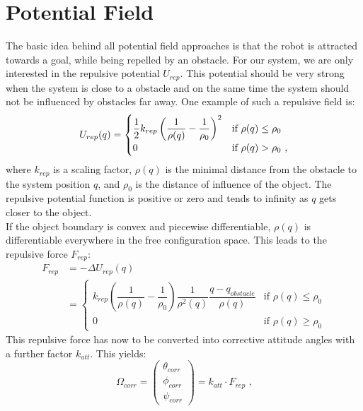 \section{Potential Field}
\label{sec:potential field}
The basic idea behind all potential field approaches is that the robot is attracted towards a goal, while being repelled by an obstacle. For our system, we are only interested in the repulsive potential $U_{rep}$. This potential should be very strong when the system is close to a obstacle and on the same time the system should not be influenced by obstacles far away. One example of such a repulsive field is:
\begin{equation}
\label{eq:pot field}
\centering
U_{rep}(q)=\begin{cases}
\dfrac{1}{2}k_{rep}\left(\dfrac{1}{\rho (q)}-\dfrac{1}{\rho_0}\right)^2 & \text{if } \rho(q)\leq\rho_0 \\
0 & \text{if } \rho(q)>\rho_0 \text{ ,}
\end{cases}
\end{equation}
where $k_{rep}$ is a scaling factor, $\rho(q)$ is the minimal distance from the obstacle to the system position $q$, and $\rho_0$ is the distance of influence of the object. The repulsive potential function is positive or zero and tends to infinity as $q$ gets closer to the object.\\
If the object boundary is convex and piecewise differentiable, $\rho(q)$ is differentiable everywhere in the free configuration space. This leads to the repulsive force $F_{rep}$:
\begin{equation}
\label{eq:force}
\begin{split}
F_{rep} &=-\Delta U_{rep}(q)\\
&=	\begin{cases}
k_{rep}\left(\dfrac{1}{\rho(q)}-\dfrac{1}{\rho_0}\right)\dfrac{1}{\rho^2(q)}\dfrac{q-q_{obstacle}}{\rho(q)} & \text{if }\rho(q)\leq\rho_0\\
0 & \text{if }\rho(q)\geq\rho_0
\end{cases}
\end{split}
\end{equation}
This repulsive force has now to be converted into corrective attitude angles with a further factor $k_{att}$. This yields: 
\begin{equation}
	\label{eq:angles}
	\Omega_{corr} =\begin{pmatrix}
	\theta_{corr} \\ \phi_{corr} \\ \psi_{corr}
	\end{pmatrix} = k_{att}\cdot F_{rep} \text{ ,}
\end{equation}
